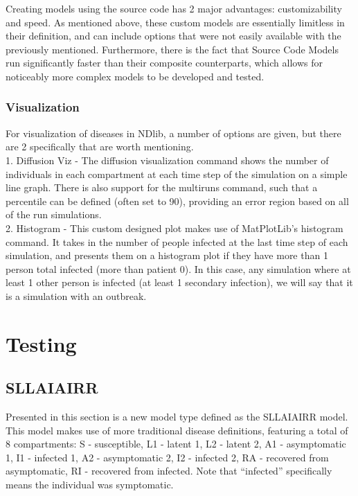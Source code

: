 \documentclass{article}
\numberwithin{equation}{section} %
\begin{document}
\begin{multicols}{2}
  Creating models using the source code has 2 major advantages: customizability and speed. As mentioned above, these custom models are essentially limitless in their definition, and can include options that were not easily available with the previously mentioned. Furthermore, there is the fact that Source Code Models run significantly faster than their composite counterparts, which allows for noticeably more complex models to be developed and tested. 

  \subsubsection{Visualization}
  For visualization of diseases in NDlib, a number of options are given, but there are 2 specifically that are worth mentioning. \\

  1. Diffusion Viz - The diffusion visualization command shows the number of individuals in each compartment at each time step of the simulation on a simple line graph. There is also support for the multiruns command, such that a percentile can be defined (often set to 90), providing an error region based on all of the run simulations. \\

  2. Histogram - This custom designed plot makes use of MatPlotLib's histogram command. It takes in the number of people infected at the last time step of each simulation, and presents them on a histogram plot if they have more than 1 person total infected (more than patient 0). In this case, any simulation where at least 1 other person is infected (at least 1 secondary infection), we will say that it is a simulation with an outbreak.

  \section{Testing}
  \subsection{SLLAIAIRR}
  Presented in this section is a new model type defined as the SLLAIAIRR model. This model makes use of more traditional disease definitions, featuring a total of 8 compartments: S - susceptible, L1 - latent 1, L2 - latent 2, A1 - asymptomatic 1, I1 - infected 1, A2 - asymptomatic 2, I2 - infected 2, RA - recovered from asymptomatic, RI - recovered from infected. Note that ``infected'' specifically means the individual was symptomatic. \\


\end{multicols}
\end{document}
